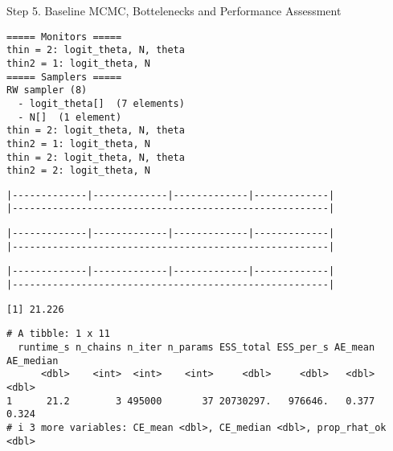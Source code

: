 \documentclass[
  10pt,
  ignorenonframetext,
  aspectratio=169]{beamer}
\begin{document}
\begin{frame}[fragile]{Step 5. Baseline MCMC, Bottelenecks and
Performance Assessment}
\label{step-5.-baseline-mcmc-bottelenecks-and-performance-assessment}
\begin{lstlisting}
===== Monitors =====
thin = 2: logit_theta, N, theta
thin2 = 1: logit_theta, N
===== Samplers =====
RW sampler (8)
  - logit_theta[]  (7 elements)
  - N[]  (1 element)
thin = 2: logit_theta, N, theta
thin2 = 1: logit_theta, N
thin = 2: logit_theta, N, theta
thin2 = 2: logit_theta, N
\end{lstlisting}

\begin{lstlisting}
|-------------|-------------|-------------|-------------|
|-------------------------------------------------------|
\end{lstlisting}

\begin{lstlisting}
|-------------|-------------|-------------|-------------|
|-------------------------------------------------------|
\end{lstlisting}

\begin{lstlisting}
|-------------|-------------|-------------|-------------|
|-------------------------------------------------------|
\end{lstlisting}

\begin{lstlisting}
[1] 21.226
\end{lstlisting}

\begin{lstlisting}
# A tibble: 1 x 11
  runtime_s n_chains n_iter n_params ESS_total ESS_per_s AE_mean AE_median
      <dbl>    <int>  <int>    <int>     <dbl>     <dbl>   <dbl>     <dbl>
1      21.2        3 495000       37 20730297.   976646.   0.377     0.324
# i 3 more variables: CE_mean <dbl>, CE_median <dbl>, prop_rhat_ok <dbl>
\end{lstlisting}


\end{frame}
\end{document}
